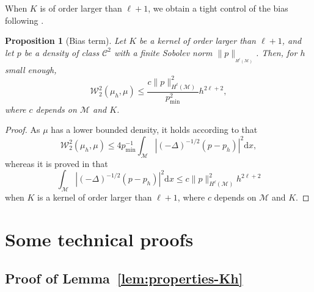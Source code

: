 \documentclass[10pt,a4paper]{article}
\newcommand\cC{\mathcal{C}}
\newcommand\cM{\mathcal{M}}
\newcommand\W{\mathcal{W}}
\newcommand\dd{\mathrm{d}}
\newcommand{\ABS}[1]{{{\left| #1 \right|}}} %
\newcommand{\PAR}[1]{{{\left(#1\right)}}} %
\let \ssection=\section
\renewcommand{\section}{\setcounter{equation}{0}\ssection}
\newtheorem{proposition}[theorem]{Proposition}
\begin{document}
When $K$ is of order larger than $\ell+1$, we obtain a tight control of the bias following \cite{Divol2022}.


\begin{proposition}[Bias term]\label{prop:bias}
Let $K$ be a kernel of order larger than $\ell+1$, and let $p$ be a density of class $\cC^2$ with a finite Sobolev norm $\|p\|_{_{H^\ell(\cM)}}$. Then, for $h$ small enough,
\begin{equation}
    \W_2^2(\mu_h,\mu) \le \frac{c\|p\|_{H^\ell(\cM)}^2}{p_{\min}^2} h^{2\ell+2},
\end{equation}
where $c$ depends on $\cM$ and $K$.
\end{proposition}

\begin{proof}
As $\mu$ has a lower bounded density, it holds according to  that 
\[
\W_2^2(\mu_h,\mu)\le 4p_{\min}^{-1}\int_{\cM}\ABS{ \PAR{-\Delta}^{-1/2}\PAR{p-p_h}}^2\dd x,
\]
whereas it is proved in \cite[Proposition 9]{Divol2022} that 
\[
\int_{\cM}\ABS{ \PAR{-\Delta}^{-1/2}\PAR{p-p_h}}^2\dd x\le c\|p\|_{H^\ell(\cM)}^2 h^{2\ell+2}
\]
when $K$ is a kernel of order larger than $\ell+1$, where $c$ depends on $\cM$ and $K$.
\end{proof}


\section{Some technical proofs}\label{A:proofs}

\subsection{Proof of Lemma~\ref{lem:properties-Kh}}\label{A:proof-properties-Kh}
\end{document}
